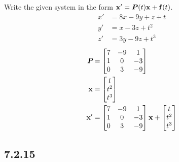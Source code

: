 \documentclass{article}
\begin{document}
Write the given system in the form $ \vect{x}' = \matr{P}(t)\vect{x} + \vect{f}(t) $.
\begin{align*}
	x' & = 8x - 9y + z + t \\
	y' & = x - 3z + t^2 \\
	z' & = 3y - 9z + t^3
\end{align*}
\begin{align*}
	\matr{P} & =
		\begin{bmatrix}
			7 & -9 & 1 \\
			1 & 0 & -3 \\
			0 & 3 & -9
		\end{bmatrix} \\
	\vect{x} & =
		\begin{bmatrix}
			t \\
			t^2 \\
			t^3
		\end{bmatrix} \\
	\vect{x}' & =
		\begin{bmatrix}
			7 & -9 & 1 \\
			1 & 0 & -3 \\
			0 & 3 & -9
		\end{bmatrix} \vect{x}
		+ \begin{bmatrix} t \\ t^2 \\ t^3 \end{bmatrix}
\end{align*}

\subsection{7.2.15}
\end{document}
